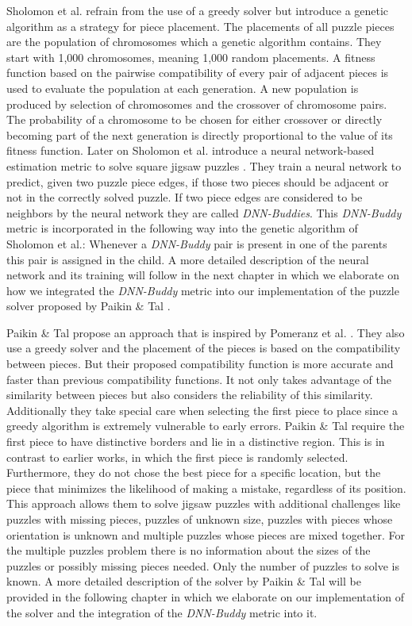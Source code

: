 \documentclass[11pt]{report}
\begin{document}
Sholomon et al. \cite{sholomon2013genetic} refrain from the use of a greedy
solver but introduce a genetic algorithm as a strategy for piece placement. The
placements of all puzzle pieces are the population of chromosomes which a genetic
algorithm contains. They start with 1,000 chromosomes, meaning 1,000 random
placements. A fitness function based on the pairwise compatibility of every pair
of adjacent pieces is used to evaluate the population at each generation. A new
population is produced by selection of chromosomes and the crossover of
chromosome pairs. The probability of a chromosome to be chosen for either
crossover or directly becoming part of the next generation is directly
proportional to the value of its fitness function. Later on Sholomon et al.
introduce a neural network-based estimation metric to solve square jigsaw
puzzles \cite{sholomon2016dnn}. They train a neural network to predict, given
two puzzle piece edges, if those two pieces should be adjacent or not in the
correctly solved puzzle. If two piece edges are considered to be neighbors by
the neural network they are called \textit{DNN-Buddies}. This \textit{DNN-Buddy}
metric is incorporated in the following way into the genetic algorithm of
Sholomon et al.: Whenever a \textit{DNN-Buddy} pair is present in one of the
parents this pair is assigned in the child. A more detailed description of the
neural network and its training will follow in the next chapter in which we
elaborate on how we integrated the \textit{DNN-Buddy} metric into our
implementation of the puzzle solver proposed by Paikin \& Tal \cite{Paikin2015}.

Paikin \& Tal \cite{Paikin2015} propose an approach that is inspired by Pomeranz
et al. \cite{Pomeranz2011}. They also use a greedy solver and the placement of
the pieces is based on the compatibility between pieces. But their proposed
compatibility function is more accurate and faster than previous compatibility
functions. It not only takes advantage of the similarity between pieces but also
considers the reliability of this similarity. Additionally they take special
care when selecting the first piece to place since a greedy algorithm is
extremely vulnerable to early errors. Paikin \& Tal require the first piece to
have distinctive borders and lie in a distinctive region. This is in contrast to
earlier works, in which the first piece is randomly selected. Furthermore, they
do not chose the best piece for a specific location, but the piece that
minimizes the likelihood of making a mistake, regardless of its position. This
approach allows them to solve jigsaw puzzles with additional challenges like
puzzles with missing pieces, puzzles of unknown size, puzzles with pieces whose
orientation is unknown and multiple puzzles whose pieces are mixed together. For
the multiple puzzles problem there is no information about the sizes of the
puzzles or possibly missing pieces needed. Only the number of puzzles to solve
is known. A more detailed description of the solver by Paikin \& Tal will be
provided in the following chapter in which we elaborate on our implementation of
the solver and the integration of the \textit{DNN-Buddy} metric into it.
\end{document}
